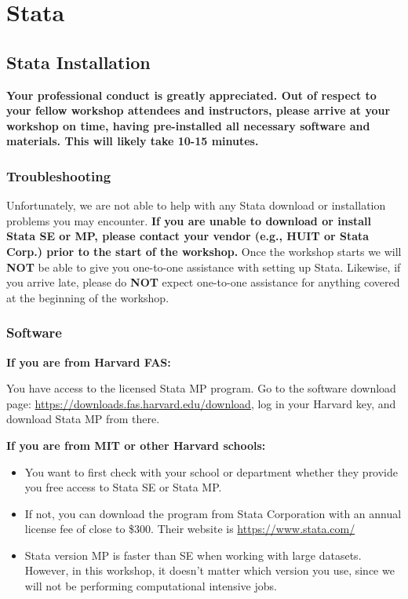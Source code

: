\documentclass[
]{book}
\providecommand{\tightlist}{%
  \setlength{\itemsep}{0pt}\setlength{\parskip}{0pt}}
\begin{document}
\hypertarget{part-stata}{%
\part{Stata}\label{part-stata}}

\hypertarget{stata-installation}{%
\chapter{Stata Installation}\label{stata-installation}}

\begin{alert}

\textbf{Your professional conduct is greatly appreciated. Out of respect to your fellow workshop attendees and instructors, please arrive at your workshop on time, having pre-installed all necessary software and materials. This will likely take 10-15 minutes.}

\end{alert}

\hypertarget{troubleshooting}{%
\section{Troubleshooting}\label{troubleshooting}}

Unfortunately, we are not able to help with any Stata download or installation problems you may encounter. \textbf{If you are unable to download or install Stata SE or MP, please contact your vendor (e.g., HUIT or Stata Corp.) prior to the start of the workshop.}
Once the workshop starts we will \textbf{NOT} be able to give you one-to-one assistance with setting up Stata. Likewise, if you arrive late, please do \textbf{NOT} expect one-to-one assistance for anything covered at the beginning of the workshop.

\hypertarget{software-2}{%
\section{Software}\label{software-2}}

\textbf{If you are from Harvard FAS:}

You have access to the licensed Stata MP program. Go to the software download page: \url{https://downloads.fas.harvard.edu/download}, log in your Harvard key, and download Stata MP from there.

\textbf{If you are from MIT or other Harvard schools:}

\begin{itemize}
\tightlist
\item
  You want to first check with your school or department whether they provide you free access to Stata SE or Stata MP.
\item
  If not, you can download the program from Stata Corporation with an annual license fee of close to \$300. Their website is \url{https://www.stata.com/}
\item
  Stata version MP is faster than SE when working with large datasets. However, in this workshop, it doesn't matter which version you use, since we will not be performing computational intensive jobs.
\end{itemize}
\end{document}
